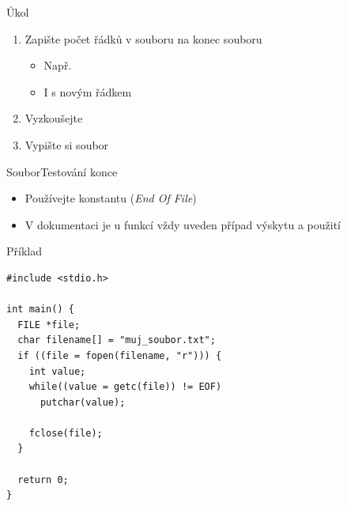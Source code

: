 \begin{frame}{Úkol}

  \begin{enumerate}
    \item Zapište počet řádků v souboru na konec souboru
    \begin{itemize}
      \item Např.\ 
      \item I s novým řádkem
    \end{itemize}

    \item Vyzkoušejte
    \item Vypište si soubor
  \end{enumerate}

\end{frame}

\begin{frame}[fragile]{Soubor}{Testování konce}

  \begin{itemize}
    \item Používejte konstantu  (\textit{End Of File})
    \item V dokumentaci je u funkcí vždy uveden případ výskytu a použití
  \end{itemize}

\begin{block}{Příklad}
\begin{lstlisting}
#include <stdio.h>

int main() {
  FILE *file;
  char filename[] = "muj_soubor.txt";
  if ((file = fopen(filename, "r"))) {
    int value;
    while((value = getc(file)) != EOF)
      putchar(value);

    fclose(file);
  }

  return 0;
}
\end{lstlisting}
\end{block}

\end{frame}

